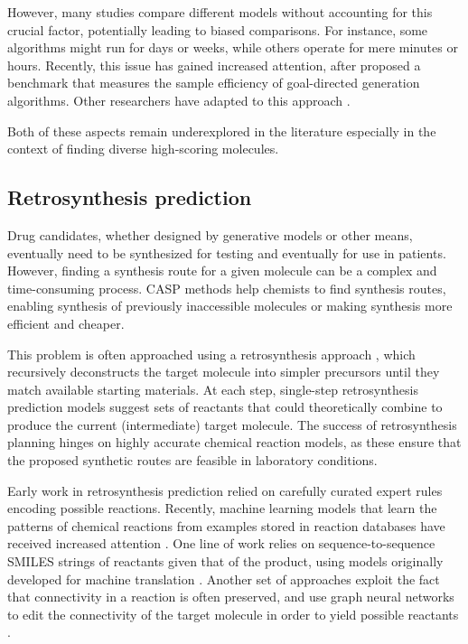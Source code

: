 However, many studies compare different models without accounting for this crucial factor,
potentially leading to biased comparisons. For instance, some algorithms might run for days or
weeks, while others operate for mere minutes or hours. Recently, this issue has gained increased
attention, after \citep{gaoSampleEfficiencyMatters2022} proposed a benchmark that measures
the sample efficiency of goal-directed generation algorithms. Other researchers have adapted to this approach
\citep{thomasReevaluatingSampleEfficiency2022,thomasAugmentedHillClimbIncreases2022,guoAugmentedMemoryCapitalizing2023}.

Both of these aspects remain underexplored in the literature especially in the context of finding
diverse high-scoring molecules.

\subsection{Retrosynthesis prediction}
Drug candidates, whether designed by generative models or other means, eventually need to be
synthesized for testing and eventually for use in patients. However, finding a synthesis route for a
given molecule can be a complex and time-consuming process. \Ac{CASP} methods help
chemists to find synthesis routes, enabling synthesis of previously inaccessible molecules or making
synthesis more efficient and cheaper.

This problem is often approached using a retrosynthesis approach
\citep{coreyComputerAssistedDesignComplex1969,coreyLogicChemicalSynthesis1991a}, which
recursively deconstructs the target molecule into simpler precursors until they match available
starting materials. At each step, single-step retrosynthesis prediction models suggest sets of
reactants that could theoretically combine to produce the current (intermediate) target molecule.
The success of retrosynthesis planning hinges on highly accurate chemical reaction models, as these
ensure that the proposed synthetic routes are feasible in laboratory conditions.

Early work in retrosynthesis prediction relied on carefully curated expert rules  encoding
possible reactions. Recently, machine learning models that learn the patterns of chemical reactions
from examples stored in reaction databases have received increased attention
\citep{coleyMachineLearningComputerAided2018}. One line of work relies on sequence-to-sequence
SMILES strings of reactants given that of the product, using models
originally developed for machine translation
\citep{schwallerMolecularTransformerModel2019,namLinkingNeuralMachine2016,schwallerFoundTranslationPredicting2018,karpovTransformerModelRetrosynthesis2019,tetkoStateoftheartAugmentedNLP2020}.
Another set of approaches exploit the fact that connectivity in a reaction is often preserved, and
use graph neural networks to edit the connectivity of the target molecule in order to yield possible
reactants \citep{sachaMoleculeEditGraph2020,shiGraphGraphsFramework2020,somnathLearningGraphModels2020,yanRetroXpertDecomposeRetrosynthesis2020}.


